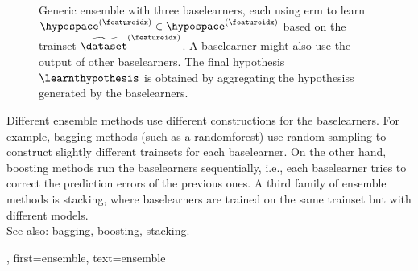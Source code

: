 {{\begin{figure}[H]
\begin{center}
		\caption{Generic ensemble with three \glspl{baselearner}, each  
			using \gls{erm} to learn $\hypospace^{(\featureidx)} \in \hypospace^{(\featureidx)}$ 
			based on the \gls{trainset} $\widetilde{\dataset}^{(\featureidx)}$. A \gls{baselearner} might also 
			use the \gls{output} of other \glspl{baselearner}. The final \gls{hypothesis} $\learnthypothesis$ 
			is obtained by aggregating the \glspl{hypothesis} generated by the \glspl{baselearner}.}
		\end{center}
		\end{figure}
		Different ensemble methods use different constructions for the \glspl{baselearner}. 
		For example, \gls{bagging} methods (such as a \gls{randomforest}) use random sampling to 
		construct slightly different \glspl{trainset} for each \gls{baselearner}. 
	    	On the other hand, \gls{boosting} methods run the \glspl{baselearner} 
		sequentially, i.e., each \gls{baselearner} tries to correct the \gls{prediction} 
		errors of the previous ones. A third family of ensemble methods is \gls{stacking}, 
		where \glspl{baselearner} are trained on the same \gls{trainset} but with 
		different \glspl{model}.
		\\
	 	See also: \gls{bagging}, \gls{boosting}, \gls{stacking}.},
	 first={ensemble},
	 text={ensemble} 
}

